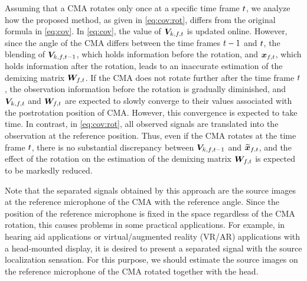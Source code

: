 \documentclass[sip,biber]{now-journal}
\begin{document}
Assuming that a CMA rotates only once at a specific time frame $t$, we analyze how the proposed method, as given in \cref{eq:cov:rot}, differs from the original formula in \cref{eq:cov}.
In \cref{eq:cov}, the value of $\cov _{\src,\ft}$ is updated online.
However, since the angle of the CMA differs between the time frames $t - 1$ and $t$, the blending of $\cov _{\src,\ft[-1]}$, which holds information before the rotation, and $\Obs _{\ft}$, which holds information after the rotation, leads to an inaccurate estimation of the demixing matrix $\Demix _{\ft}$.
If the CMA does not rotate further after the time frame $t$,
the observation information before the rotation is gradually diminished, and
$\cov _{\src,\ft}$ and $\Demix _{\ft}$ are expected to slowly converge to their values associated with the postrotation position of CMA.
However, this convergence is expected to take time.
In contrast, in \cref{eq:cov:rot}, all observed signals are translated into the observation at the reference position.
Thus, even if the CMA rotates at the time frame $t$, there is no substantial discrepancy between $\cov _{\src,\ft[-1]}$ and $\refpos{\Obs} _{\ft}$, and the effect of the rotation on the estimation of the demixing matrix $\Demix _{\ft}$ is expected to be markedly reduced.

Note that the separated signals obtained by this approach are the source images at the reference microphone of the CMA with the reference angle.
Since the position of the reference microphone is fixed in the space regardless of the CMA rotation, this causes problems in some practical applications.
For example, in hearing aid applications or virtual/augmented reality (VR/AR) applications with a head-mounted display, it is desired to present a separated signal with the source localization sensation.
For this purpose, we should estimate the source images on the reference microphone of the CMA rotated together with the head.
\end{document}
